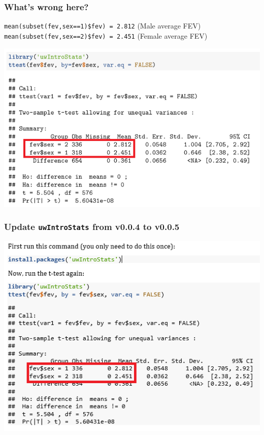 \documentclass[12pt, 
hyperref={colorlinks=true, linkcolor=blue, urlcolor=cyan}]{beamer}
\begin{document}
\begin{frame}[noframenumbering]
\frametitle{What's wrong here?}

\begin{footnotesize} \texttt{mean(subset(fev,sex==1)\$fev) = 2.812} \color{red} (Male average FEV) \color{black} \\ \texttt{mean(subset(fev,sex==2)\$fev) = 2.451} \color{red} (Female average FEV) \color{black}\end{footnotesize} \vspace{-0.3cm}

\hspace*{-0.5cm} \includegraphics[width=0.9\paperwidth]{./t-test-bug}

\end{frame}

\begin{frame}
\frametitle{Update \texttt{uwIntroStats} from v0.0.4 to v0.0.5}

\hspace*{-0.5cm} \includegraphics[height=0.88\paperheight]{./t-test-bug-fixed}

\end{frame}
\end{document}
